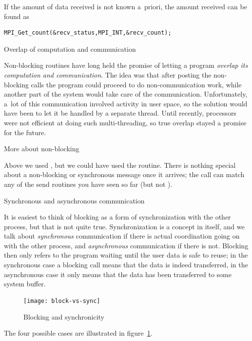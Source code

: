 If the amount of data received is not known a~priori, the amount received
can be found as
\begin{verbatim}
MPI_Get_count(&recv_status,MPI_INT,&recv_count);
\end{verbatim}


 {Overlap of computation and communication}

Non-blocking routines have long held the promise of letting a
program \emph{overlap its computation and
communication}.  The
idea was that after posting the non-blocking calls the program could
proceed to do non-communication work, while another part of the system
would take care of the communication. Unfortunately, a~lot of this 
communication involved activity in user space, so the solution would have
been to let it be handled by a separate thread. Until recently, processors
were not efficient at doing such multi-threading, so true overlap 
stayed a promise for the future.

 {More about non-blocking}

Above we used , but we could have used the 
routine.  There is nothing special about a non-blocking or synchronous
message once it arrives; the  call can match any of the
send routines you have seen so far (but not ).

 {Synchronous and asynchronous communication}


It is easiest to think of blocking as a form of synchronization with
the other process, but that is not quite true. Synchronization is a
concept in itself, and we talk about \emph{synchronous} communication
if there is actual coordination going on with the other process,
and \emph{asynchronous} communication if there is not. Blocking then
only refers to the program waiting until the user data is safe
to reuse; in the synchronous case a blocking call means that the data
is indeed transferred, in the asynchronous case it only means that the
data has been transferred to some system buffer.
%
\begin{figure}[ht]
\texttt{[image: block-vs-sync]}
\caption{Blocking and synchronicity}
\label{fig:block-sync}
\end{figure}
The four possible cases are illustrated in figure~\ref{fig:block-sync}.

